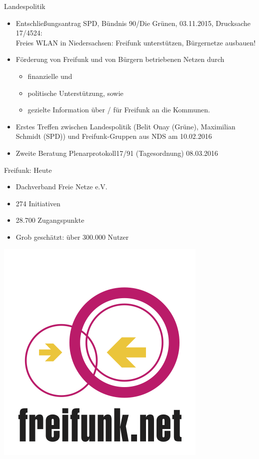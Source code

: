 \documentclass[fleqn,11pt,aspectratio=169]{beamer}
\begin{document}
\begin{frame}{Landespolitik}
  \begin{itemize}
    \item Entschließungsantrag SPD, Bündnis 90/Die Grünen, 03.11.2015, Drucksache 17/4524: \\
    Freies WLAN in Niedersachsen: Freifunk unterstützen, Bürgernetze ausbauen!
    \item Förderung von Freifunk und von Bürgern betriebenen Netzen durch 
    \begin{itemize} 
      \item finanzielle und 
      \item politische Unterstützung, sowie
      \item gezielte Information über / für Freifunk an die Kommunen.
    \end{itemize}
    \item Erstes Treffen zwischen Landespolitik (Belit Onay (Grüne), Maximilian Schmidt (SPD)) und Freifunk-Gruppen aus NDS am 10.02.2016
    \item Zweite Beratung Plenarprotokoll17/91 (Tagesordnung) 08.03.2016 
  \end{itemize}
\end{frame}

\begin{frame}{Freifunk: Heute}
	\begin{multicols*}{2}
	\begin{block}{}
  \begin{itemize}
		\item Dachverband Freie Netze e.V.
		\item 274 Initiativen
		\item 28.700 Zugangspunkte
		\item Grob geschätzt: über 300.000 Nutzer
	\end{itemize}
	\end{block}
	\centering
	\includegraphics[height=0.9\textheight]{freifunk.png}
	\end{multicols*}
\end{frame}
\end{document}
